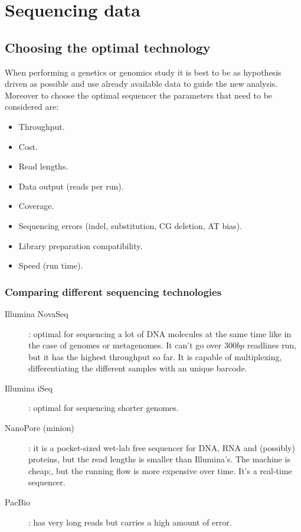 \graphicspath{{chapters/images/04/}}
\chapter{Sequencing data}

\section{Choosing the optimal technology}
When performing a genetics or genomics study it is best to be as hypothesis driven as possible and use already available data to guide the new analysis.
Moreover to choose the optimal sequencer the parameters that need to be considered are:

\begin{multicols}{2}
	\begin{itemize}
		\item Throughput.
		\item Cost.
		\item Read lengths.
		\item Data output (reads per run).
		\item Coverage.
		\item Sequencing errors (indel, substitution, CG deletion, AT bias).
		\item Library preparation compatibility.
		\item Speed (run time).
	\end{itemize}
\end{multicols}

	\subsection{Comparing different sequencing technologies}

	\begin{multicols}{2}
		\begin{description}
			\item[Illumina NovaSeq]: optimal for sequencing a lot of DNA molecules at the same time like in the case of genomes or metagenomes.
				It can’t go over $300 bp$ readlines run, but it has the highest throughput so far.
				It is capable of multiplexing, differentiating the different samples with an unique barcode.
			\item[Illumina iSeq]: optimal for sequencing shorter genomes.
			\item[NanoPore (minion)]: it is a pocket-sized wet-lab free sequencer for DNA, RNA and (possibly) proteins, but the read lengths is smaller than Illumina's.
				The machine is cheap;, but the running flow is more expensive over time.
				It's a real-time sequencer.
			\item[PacBio]: has very long reads but carries a high amount of error.
		\end{description}
	\end{multicols}

